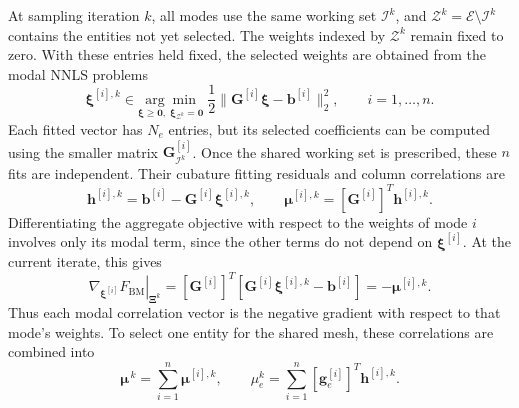 \documentclass[a4paper,12pt]{article}
\newcommand{\vect}[1]{\boldsymbol{#1}}
\newcommand{\matr}[1]{\boldsymbol{#1}}
\begin{document}
At sampling iteration $k$, all modes use the same working set $\mathcal I^k$, and $\mathcal Z^k=\mathcal E\setminus\mathcal I^k$ contains the entities not yet selected. The weights indexed by $\mathcal Z^k$ remain fixed to zero. With these entries held fixed, the selected weights are obtained from the modal NNLS problems
\begin{equation}
 \vect{\xi}^{[i],k}\in
 \underset{\vect{\xi}\geq\vect{0},\;\vect{\xi}_{\mathcal Z^k}=\vect{0}}{\arg\min}\;
 \frac12\|\matr{G}^{[i]}\vect{\xi}-\vect{b}^{[i]}\|_2^2,
 \qquad i=1,\ldots,n.
 \label{eq:bm-nnls}
\end{equation}
Each fitted vector has $N_e$ entries, but its selected coefficients can be computed using the smaller matrix $\matr{G}^{[i]}_{\mathcal I^k}$. Once the shared working set is prescribed, these $n$ fits are independent. Their cubature fitting residuals and column correlations are
\begin{equation}
 \vect{h}^{[i],k}
 =\vect{b}^{[i]}-\matr{G}^{[i]}\vect{\xi}^{[i],k},
 \qquad
 \vect{\mu}^{[i],k}
 =[\matr{G}^{[i]}]^T\vect{h}^{[i],k}.
 \label{eq:modal-fitting-residual}
\end{equation}
Differentiating the aggregate objective with respect to the weights of mode $i$ involves only its modal term, since the other terms do not depend on $\vect{\xi}^{[i]}$. At the current iterate, this gives
\[
 \left.\nabla_{\vect{\xi}^{[i]}}F_{\mathrm{BM}}\right|_{\matr{\Xi}^k}
 =[\matr{G}^{[i]}]^T
       [\matr{G}^{[i]}\vect{\xi}^{[i],k}-\vect{b}^{[i]}]
 =-\vect{\mu}^{[i],k}.
\]
Thus each modal correlation vector is the negative gradient with respect to that mode's weights. To select one entity for the shared mesh, these correlations are combined into
\begin{equation}
 \vect{\mu}^{\,k}=\sum_{i=1}^n\vect{\mu}^{[i],k},
 \qquad
 \mu_e^k=\sum_{i=1}^n
             [\vect{g}_e^{[i]}]^T\vect{h}^{[i],k}.
 \label{eq:score}
\end{equation}
\end{document}

